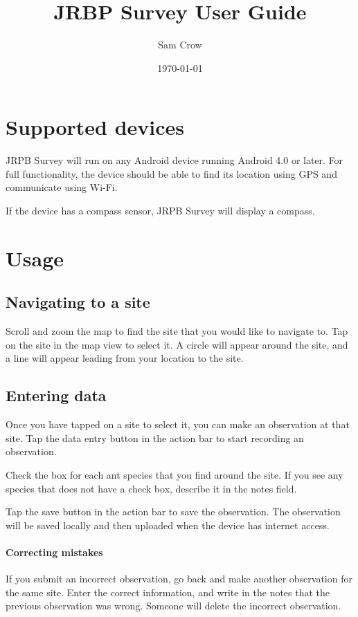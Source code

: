 \documentclass{article}
\title{JRBP Survey User Guide}
\author{Sam Crow}
\date{\today}
\begin{document}
\maketitle{}

\section{Supported devices}

JRPB Survey will run on any Android device running Android 4.0 or later. For full functionality, the device should be able to find its location using GPS and communicate using Wi-Fi.

If the device has a compass sensor, JRPB Survey will display a compass.

\section{Usage}

\subsection{Navigating to a site}

Scroll and zoom the map to find the site that you would like to navigate to. Tap on the site in the map view to select it. A circle will appear around the site, and a line will appear leading from your location to the site.

\subsection{Entering data}

Once you have tapped on a site to select it, you can make an observation at that site. Tap the data entry button in the action bar to start recording an observation.

Check the box for each ant species that you find around the site. If you see any species that does not have a check box, describe it in the notes field.

Tap the save button in the action bar to save the observation. The observation will be saved locally and then uploaded when the device has internet access.

\paragraph{Correcting mistakes}

If you submit an incorrect observation, go back and make another observation for the same site. Enter the correct information, and write in the notes that the previous observation was wrong. Someone will delete the incorrect observation.
\end{document}
